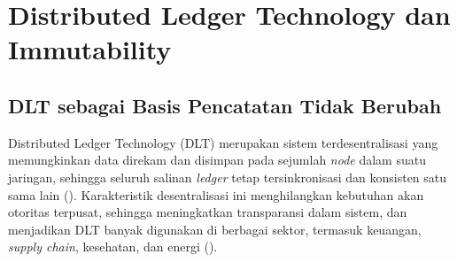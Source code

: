 %
%
%
%

\section{Distributed Ledger Technology dan Immutability}
\label{sec:dlt}

\subsection{DLT sebagai Basis Pencatatan Tidak Berubah}
\label{subsec:dlt-umum}

Distributed Ledger Technology (DLT) merupakan sistem terdesentralisasi yang memungkinkan data direkam dan disimpan pada sejumlah \textit{node} dalam suatu jaringan, sehingga seluruh salinan \textit{ledger} tetap tersinkronisasi dan konsisten satu sama lain (\cite{DecMed}). Karakteristik desentralisasi ini menghilangkan kebutuhan akan otoritas terpusat, sehingga meningkatkan transparansi dalam sistem, dan menjadikan DLT banyak digunakan di berbagai sektor, termasuk keuangan, \textit{supply chain}, kesehatan, dan energi (\cite{DecMed}).

